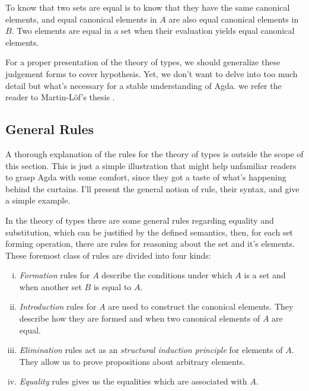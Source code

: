 To know that two sets are equal is to know that they have the same canonical elements, and
equal canonical elements in $A$ are also equal canonical elements in $B$. Two elements are
equal in a set when their evaluation yields equal canonical elements.

For a proper presentation of the theory of types, we should generalize these judgement forms
to cover hypothesis. Yet, we don't want to delve into too much detail but what's necessary for 
a stable understanding of Agda. we refer the reader to Martin-L\"{o}f's thesis \cite{lof84,lof85}.

\subsection{General Rules}

A thorough explanation of the rules for the theory of types is outside the scope of this section. 
This is just a simple illustration that might help unfamiliar readers to grasp Agda with
some comfort, since they got a taste of what's happening behind the curtains. I'll present the
general notion of rule, their syntax, and give a simple example.

In the theory of types there are some general rules regarding equality and substitution, 
which can be justified by the defined semantics, then, for each set forming operation, there
are rules for reasoning about the set and it's elements. These foremost class of rules
are divided into four kinds:

\begin{enumerate}[i)]
  \item \emph{Formation} rules for $A$ describe the conditions under which $A$ is a set and
        when another set $B$ is equal to $A$.
        
  \item \emph{Introduction} rules for $A$ are used to construct the canonical elements. They
        describe how they are formed and when two canonical elements of $A$ are equal.
        
  \item \emph{Elimination} rules act as an \emph{structural induction principle} for elements of $A$.
        They allow us to prove propositions about arbitrary elements.
        
  \item \emph{Equality} rules gives us the equalities which are associated with $A$.
\end{enumerate}

